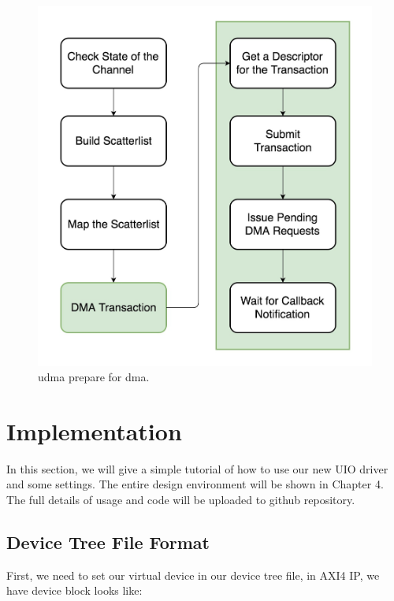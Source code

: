 \begin{figure}[!htb]
  \centering
  \includegraphics[scale=0.3]{images/udma_prepare_dma.jpg}
  \caption[Udma Prepare for DMA.]{udma prepare for dma.}
  \label{fig:Udma Prepare for DMA.}
\end{figure}








\section{Implementation}
\label{sec:Implementation}
In this section, we will give a simple tutorial of how to use our new UIO driver and some settings. The entire design environment will be shown in Chapter 4. The full details of usage and code will be uploaded to github repository\cite{mainwork}. 


\subsection{Device Tree File Format}
\label{subsec:Device Tree}
First, we need to set our virtual device in our device tree file, in AXI4 IP, we have device block looks like:

